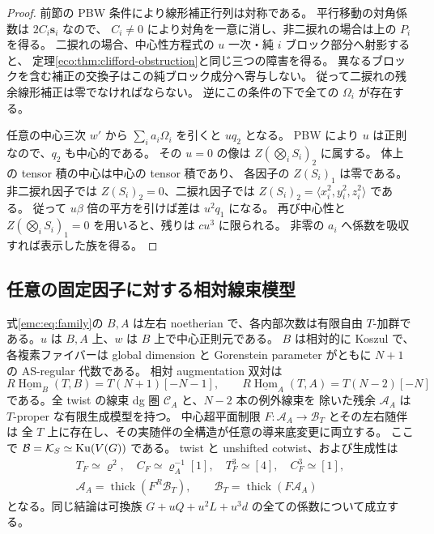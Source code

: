 \begin{proof}
前節の PBW 条件により線形補正行列は対称である。
平行移動の対角係数は $2C_i\mathbf s_i$ なので、
$C_i\ne0$ により対角を一意に消し、非二捩れの場合は上の $P_i$ を得る。
二捩れの場合、中心性方程式の $u$ 一次・純 $i$ ブロック部分へ射影すると、
定理\ref{eco:thm:clifford-obstruction}と同じ三つの障害を得る。
異なるブロックを含む補正の交換子はこの純ブロック成分へ寄与しない。
従って二捩れの残余線形補正は零でなければならない。
逆にこの条件の下で全ての $\Omega_i$ が存在する。

任意の中心三次 $w'$ から $\sum_i a_i\Omega_i$ を引くと $u q_2$ となる。
PBW により $u$ は正則なので、$q_2$ も中心的である。
その $u=0$ の像は $Z(\bigotimes_iS_i)_2$ に属する。
体上の tensor 積の中心は中心の tensor 積であり、
各因子の $Z(S_i)_1$ は零である。
非二捩れ因子では $Z(S_i)_2=0$、二捩れ因子では
$Z(S_i)_2=\langle x_i^2,y_i^2,z_i^2\rangle$ である。
従って $u\beta$ 倍の平方を引けば差は $u^2q_1$ になる。
再び中心性と $Z(\bigotimes_iS_i)_1=0$ を用いると、残りは $cu^3$ に限られる。
非零の $a_i$ へ係数を吸収すれば表示した族を得る。
\end{proof}



\subsection{任意の固定因子に対する相対線束模型}

\begin{proposition}[全係数上の周囲正則性と実球面随伴]
\label{emc:prop:line-model}
式\eqref{emc:eq:family}の $B,A$ は左右 noetherian で、各内部次数は有限自由
$T$-加群である。$u$ は $B,A$ 上、$w$ は $B$ 上で中心正則元である。
$B$ は相対的に Koszul で、各複素ファイバーは global dimension と
Gorenstein parameter がともに $N+1$ の AS-regular 代数である。
相対 augmentation 双対は
\[
 R\underline{\operatorname{Hom}}_B(T,B)=T(N+1)[-N-1],\qquad
 R\underline{\operatorname{Hom}}_A(T,A)=T(N-2)[-N]
\]
である。全 twist の線束 dg 圏 $\mathcal C_A$ と、$N-2$ 本の例外線束を
除いた残余 $\mathcal A_A$ は $T$-proper な有限生成模型を持つ。
中心超平面制限 $F:\mathcal A_A\to\mathcal B_T$ とその左右随伴は
全 $T$ 上に存在し、その実随伴の全構造が任意の導来底変更に両立する。
ここで $\mathcal B=\mathcal K_S\simeq\operatorname{Ku}(V(G))$ である。
twist と unshifted cotwist、および生成性は
\[
 \begin{gathered}
 T_F\simeq\varrho^2,\quad C_F\simeq\varrho_A^{-1}[1],\quad
 T_F^3\simeq[4],\quad C_F^3\simeq[1],\\
 \mathcal A_A=\operatorname{thick}(F^R\mathcal B_T),\qquad
 \mathcal B_T=\operatorname{thick}(F\mathcal A_A)
 \end{gathered}
\]
となる。同じ結論は可換族 $G+uQ+u^2L+u^3d$ の全ての係数について成立する。
\end{proposition}


